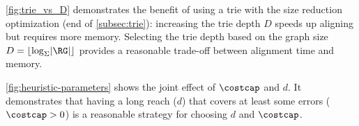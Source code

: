 \cref{fig:trie_vs_D} demonstrates the benefit of using a trie with the size
reduction optimization (end of \cref{subsec:trie}): increasing the trie depth
$D$ speeds up aligning but requires more memory. Selecting the trie depth based
on the graph size \mbox{$D = \lfloor \log_\Sigma \lvert \RG \rvert \rfloor$}
provides a reasonable trade-off between alignment time and memory.

\cref{fig:heuristic-parameters} shows the joint effect of $\costcap$ and $d$. It
demonstrates that having a long reach ($d$) that covers at least some errors
($\costcap > 0$) is a reasonable strategy for choosing $d$ and $\costcap$.